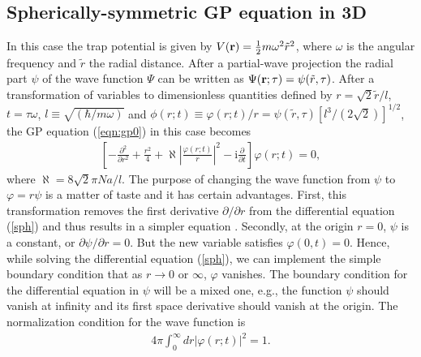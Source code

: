 \documentclass[onecolumn]{elsart3p}
\begin{document}
\subsection{Spherically-symmetric GP equation in 3D}

In this case  the trap potential is given by $V({\bf r}) =\frac{1}{2}m \omega ^2
\tilde r^2$, where $\omega$ is the angular frequency and $\tilde r$ the radial
distance. After a partial-wave projection the radial part $\psi$ of 
the wave function $\Psi$ can be written as $\Psi({\bf 
r};\tau) =\psi(\tilde
r,\tau)$. After a transformation of variables to  dimensionless quantities
defined by $r =\sqrt 2 \tilde r/l$, $t=\tau \omega$, $l\equiv \sqrt
{(\hbar/m\omega)} $ and $\phi(r;t) \equiv \varphi(r;t)/r =\psi(\tilde r,\tau)[
l^3/(2\sqrt 2)]^{1/2}$, the GP equation (\ref{eqn:gp0}) in this case becomes
\begin{eqnarray}
\left[-\frac{\partial^2}
{\partial r^2}+\frac{r^2}{4}+\aleph            %
\left| \frac{\varphi(r;t)}{r}
\right| ^2 -
\mbox{i}\frac{\partial }{\partial t}\right] \varphi
(r;t)=0,
\label{sph}
\end{eqnarray}
where $\aleph %
=8\sqrt 2\pi  N a/l$. {The purpose of 
changing the wave function from $\psi$ to $\varphi=r\psi$ is a matter of 
taste and  it has certain advantages.
 First, this transformation removes the first derivative 
$\partial/\partial r$ from the differential equation (\ref{sph}) 
and thus results in a simpler equation  \cite{num26}. 
Secondly, at the origin $r=0$, $\psi$ is a constant, or 
$\partial \psi/\partial r=0$. But the new variable satisfies 
$\varphi(0,t)=0$. Hence, while solving the
differential equation (\ref{sph}),
we can implement the 
simple boundary condition 
that as $r \to 0 $ or $\infty$, $\varphi$ vanishes. 
The boundary condition for the 
differential 
equation in $\psi$ will be  a mixed one, e.g., the function $\psi$ 
should 
vanish at infinity  and its first space derivative should vanish at 
the origin. }     
The normalization condition for the
wave function is
\begin{align}
\label{n1}
4\pi \int_0^\infty dr \vert\varphi(r;t)\vert^2=1.
\end{align}
\end{document}
